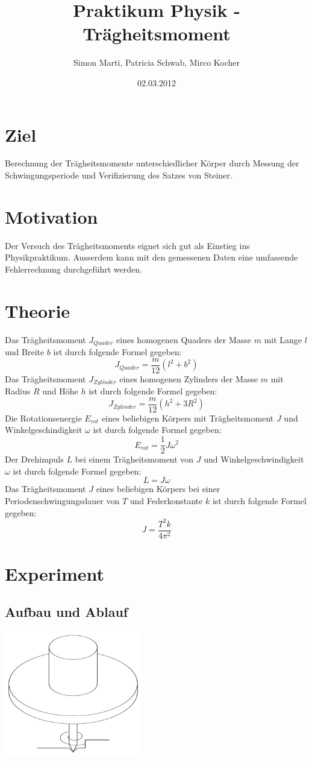 \documentclass[12pt,a4paper]{article}
\title{Praktikum Physik - Tr\"agheitsmoment}
\author{Simon Marti, Patricia Schwab, Mirco Kocher}
\date{02.03.2012}
\begin{document}
\maketitle

\section*{Ziel}
Berechnung der Tr\"agheitsmomente unterschiedlicher K\"orper durch Messung der Schwingungsperiode und Verifizierung des Satzes von Steiner.

\section*{Motivation}
Der Versuch des Tr\"agheitsmoments eignet sich gut als Einstieg ins Physikpraktikum. Ausserdem kann mit den gemessenen Daten eine umfassende Fehlerrechnung durchgef\"uhrt werden.

\section*{Theorie}
Das Tr\"agheitsmoment $J_{Quader}$ eines homogenen Quaders der Masse $m$ mit Lange $l$ und Breite $b$ ist durch folgende Formel gegeben:
\[ J_{Quader} = \frac{m}{12}(l^2 + b^2) \]
Das Tr\"agheitsmoment $J_{Zylinder}$ eines homogenen Zylinders der Masse $m$ mit Radius $R$ und H\"ohe $h$ ist durch folgende Formel gegeben:
\[  J_{Zylinder} = \frac{m}{12}(h^2 + 3R^2) \]
Die Rotationsenergie $E_{rot}$ eines beliebigen K\"orpers mit Tr\"agheitsmoment $J$ und Winkelgeschindigkeit $\omega$ ist durch folgende Formel gegeben:
\[ E_{rot} = \frac{1}{2}J\omega^2 \]
Der Drehimpuls $L$ bei einem Tr\"agheitsmoment von $J$ und Winkelgeschwindigkeit $\omega$ ist durch folgende Formel gegeben:
\[ L = J\omega \]
Das Tr\"agheitsmoment $J$ eines beliebigen K\"orpers bei einer Periodenschwingungsdauer von $T$ und Federkonstante $k$ ist durch folgende Formel gegeben:
\[ J = \frac{T^2k}{4\pi^2} \]

\section*{Experiment}

\subsection*{Aufbau und Ablauf}
\includegraphics[width=6cm]{illustration11.pdf}
\end{document}

